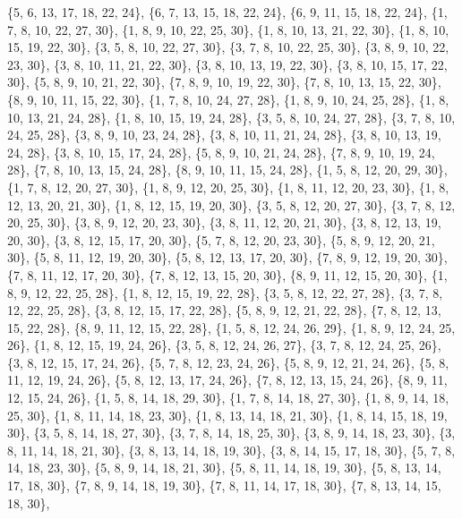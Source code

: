 \documentclass[11pt,a4paper]{article}
\begin{document}
{\{5, 6, 13, 17, 18, 22, 24\}, \{6, 7, 13, 15, 18, 22, 24\}, \{6, 9, 11, 15, 18, 22, 24\}, \{1, 7, 8, 10, 22, 27, 30\}, \{1, 8, 9, 10, 22, 25, 30\},
\{1, 8, 10, 13, 21, 22, 30\}, \{1, 8, 10, 15, 19, 22, 30\}, \{3, 5, 8, 10, 22, 27, 30\}, \{3, 7, 8, 10, 22, 25, 30\}, \{3, 8, 9, 10, 22, 23, 30\},
\{3, 8, 10, 11, 21, 22, 30\}, \{3, 8, 10, 13, 19, 22, 30\}, \{3, 8, 10, 15, 17, 22, 30\}, \{5, 8, 9, 10, 21, 22, 30\}, \{7, 8, 9, 10, 19, 22, 30\},
\{7, 8, 10, 13, 15, 22, 30\}, \{8, 9, 10, 11, 15, 22, 30\}, \{1, 7, 8, 10, 24, 27, 28\}, \{1, 8, 9, 10, 24, 25, 28\}, \{1, 8, 10, 13, 21, 24, 28\},
\{1, 8, 10, 15, 19, 24, 28\}, \{3, 5, 8, 10, 24, 27, 28\}, \{3, 7, 8, 10, 24, 25, 28\}, \{3, 8, 9, 10, 23, 24, 28\}, \{3, 8, 10, 11, 21, 24, 28\},
\{3, 8, 10, 13, 19, 24, 28\}, \{3, 8, 10, 15, 17, 24, 28\}, \{5, 8, 9, 10, 21, 24, 28\}, \{7, 8, 9, 10, 19, 24, 28\}, \{7, 8, 10, 13, 15, 24, 28\},
\{8, 9, 10, 11, 15, 24, 28\}, \{1, 5, 8, 12, 20, 29, 30\}, \{1, 7, 8, 12, 20, 27, 30\}, \{1, 8, 9, 12, 20, 25, 30\}, \{1, 8, 11, 12, 20, 23, 30\},
\{1, 8, 12, 13, 20, 21, 30\}, \{1, 8, 12, 15, 19, 20, 30\}, \{3, 5, 8, 12, 20, 27, 30\}, \{3, 7, 8, 12, 20, 25, 30\}, \{3, 8, 9, 12, 20, 23, 30\},
\{3, 8, 11, 12, 20, 21, 30\}, \{3, 8, 12, 13, 19, 20, 30\}, \{3, 8, 12, 15, 17, 20, 30\}, \{5, 7, 8, 12, 20, 23, 30\}, \{5, 8, 9, 12, 20, 21, 30\},
\{5, 8, 11, 12, 19, 20, 30\}, \{5, 8, 12, 13, 17, 20, 30\}, \{7, 8, 9, 12, 19, 20, 30\}, \{7, 8, 11, 12, 17, 20, 30\}, \{7, 8, 12, 13, 15, 20, 30\},
\{8, 9, 11, 12, 15, 20, 30\}, \{1, 8, 9, 12, 22, 25, 28\}, \{1, 8, 12, 15, 19, 22, 28\}, \{3, 5, 8, 12, 22, 27, 28\}, \{3, 7, 8, 12, 22, 25, 28\},
\{3, 8, 12, 15, 17, 22, 28\}, \{5, 8, 9, 12, 21, 22, 28\}, \{7, 8, 12, 13, 15, 22, 28\}, \{8, 9, 11, 12, 15, 22, 28\}, \{1, 5, 8, 12, 24, 26, 29\},
\{1, 8, 9, 12, 24, 25, 26\}, \{1, 8, 12, 15, 19, 24, 26\}, \{3, 5, 8, 12, 24, 26, 27\}, \{3, 7, 8, 12, 24, 25, 26\}, \{3, 8, 12, 15, 17, 24, 26\},
\{5, 7, 8, 12, 23, 24, 26\}, \{5, 8, 9, 12, 21, 24, 26\}, \{5, 8, 11, 12, 19, 24, 26\}, \{5, 8, 12, 13, 17, 24, 26\}, \{7, 8, 12, 13, 15, 24, 26\},
\{8, 9, 11, 12, 15, 24, 26\}, \{1, 5, 8, 14, 18, 29, 30\}, \{1, 7, 8, 14, 18, 27, 30\}, \{1, 8, 9, 14, 18, 25, 30\}, \{1, 8, 11, 14, 18, 23, 30\},
\{1, 8, 13, 14, 18, 21, 30\}, \{1, 8, 14, 15, 18, 19, 30\}, \{3, 5, 8, 14, 18, 27, 30\}, \{3, 7, 8, 14, 18, 25, 30\}, \{3, 8, 9, 14, 18, 23, 30\},
\{3, 8, 11, 14, 18, 21, 30\}, \{3, 8, 13, 14, 18, 19, 30\}, \{3, 8, 14, 15, 17, 18, 30\}, \{5, 7, 8, 14, 18, 23, 30\}, \{5, 8, 9, 14, 18, 21, 30\},
\{5, 8, 11, 14, 18, 19, 30\}, \{5, 8, 13, 14, 17, 18, 30\}, \{7, 8, 9, 14, 18, 19, 30\}, \{7, 8, 11, 14, 17, 18, 30\}, \{7, 8, 13, 14, 15, 18, 30\},
}
\end{document}
